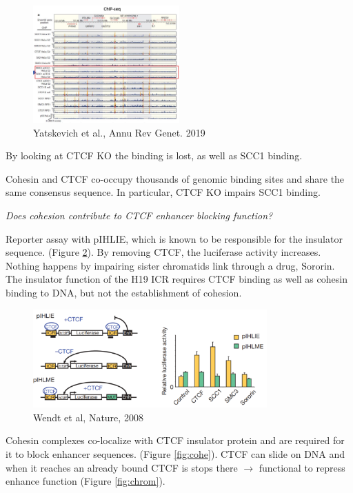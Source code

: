 \begin{figure}
\centering
\includegraphics[width=0.5\textwidth]{../_resources/Screenshot_2022-10-14_at_19-51-43.png}
\caption{Yatskevich et al., Annu Rev Genet. 2019}
\label{fig:chip}
\end{figure}

By looking at CTCF KO the binding is lost, as well as SCC1 binding.

Cohesin and CTCF co-occupy thousands of genomic binding sites and share the same consensus sequence. In particular, CTCF KO impairs SCC1 binding.

\emph{Does cohesion contribute to CTCF enhancer blocking function?}

Reporter assay with pIHLIE, which is known to be responsible for the insulator sequence. (Figure \ref{fig:rep}). By removing CTCF, the luciferase activity increases. Nothing happens by impairing sister chromatids link through a drug, Sororin. The insulator function of the H19 ICR requires CTCF binding as well as cohesin binding to DNA, but not the establishment of cohesion.

\begin{figure}
\centering
\includegraphics[width=0.8\textwidth]{../_resources/Screenshot_2022-10-14_at_19-50-44.png}
\caption{Wendt et al, Nature, 2008}
\label{fig:rep}
\end{figure}

Cohesin complexes co-localize with CTCF insulator protein and are required for it to block enhancer sequences. (Figure \ref{fig:cohe}). CTCF can slide on DNA and when it reaches an already bound CTCF is stops there $\rightarrow$ functional to repress enhance function (Figure \ref{fig:chrom}).

